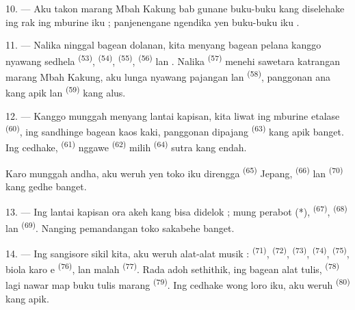 10. --- Aku takon marang Mbah Kakung bab gunane buku-buku kang
diselehake ing rak ing mburine  iku ; panjenengane
ngendika yen buku-buku iku .

\VUsaut{3.6mm}
\VUsaut{2.8mm}

11. --- Nalika ninggal bagean dolanan, kita menyang bagean pelana
kanggo nyawang sedhela  \textsuperscript{(53)},
 \textsuperscript{(54)}, 
\textsuperscript{(55)},  \textsuperscript{(56)} lan
. Nalika  \textsuperscript{(57)}
menehi sawetara katrangan marang Mbah Kakung, aku lunga nyawang
pajangan  lan  \textsuperscript{(58)},
panggonan ana  kang apik lan 
\textsuperscript{(59)} kang alus.

12. --- Kanggo munggah menyang lantai kapisan, kita liwat ing mburine
etalase  \textsuperscript{(60)}, ing sandhinge bagean kaos
kaki, panggonan dipajang  \textsuperscript{(63)} kang
apik banget. Ing cedhake, 
\textsuperscript{(61)} nggawe 
\textsuperscript{(62)} milih  \textsuperscript{(64)} sutra
kang endah.

Karo munggah andha, aku weruh yen toko iku direngga 
\textsuperscript{(65)} Jepang,  \textsuperscript{(66)} lan
 \textsuperscript{(70)} kang gedhe banget.

13. --- Ing lantai kapisan ora akeh kang bisa didelok ; mung perabot
(*),  \textsuperscript{(67)}, 
\textsuperscript{(68)} lan  \textsuperscript{(69)}.
Nanging pemandangan toko sakabehe  banget.

14. --- Ing sangisore sikil kita, aku weruh alat-alat musik :
 \textsuperscript{(71)}, 
\textsuperscript{(72)},  \textsuperscript{(73)},
 \textsuperscript{(74)}, 
\textsuperscript{(75)}, biola karo e
\textsuperscript{(76)}, lan malah 
\textsuperscript{(77)}. Rada adoh sethithik, ing bagean alat tulis,
 \textsuperscript{(78)} lagi nawar map buku tulis marang
 \textsuperscript{(79)}. Ing cedhake wong loro iku, aku
weruh  \textsuperscript{(80)} kang apik.

